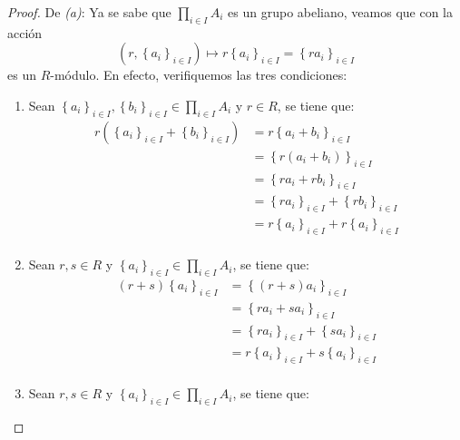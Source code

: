 \documentclass[12pt]{report}
\newcounter{it}
\theoremstyle{largebreak}
\begin{document}
    \begin{proof}
        De \textit{(a)}: Ya se sabe que $\prod_{ i\in I}A_i$ es un grupo abeliano, veamos que con la acción
        \begin{equation*}
            \left(r,\left\{a_i \right\}_{ i\in I} \right)\mapsto r\left\{a_i \right\}_{ i\in I}=\left\{ra_i \right\}_{ i\in I}
        \end{equation*}
        es un $R$-módulo. En efecto, verifiquemos las tres condiciones:
        \begin{enumerate}[label = \textit{(\arabic*)}]
            \item Sean $\left\{a_i \right\}_{ i\in I},\left\{b_i \right\}_{ i\in I}\in\prod_{ i\in I}A_i$ y $r\in R$, se tiene que:
            \begin{equation*}
                \begin{split}
                    r\left(\left\{a_i \right\}_{ i\in I}+\left\{b_i \right\}_{ i\in I} \right)&=r\left\{a_i+b_i \right\}_{ i\in I}\\
                    &=\left\{r(a_i+b_i) \right\}_{ i\in I}\\
                    &=\left\{ra_i+rb_i \right\}_{ i\in I}\\
                    &=\left\{ra_i \right\}_{ i\in I}+\left\{rb_i \right\}_{ i\in I}\\
                    &=r\left\{a_i \right\}_{ i\in I}+r\left\{a_i \right\}_{ i\in I}\\
                \end{split}
            \end{equation*}
            \item Sean $r,s\in R$ y $\left\{a_i \right\}_{ i\in I}\in\prod_{ i\in I}A_i$, se tiene que:
            \begin{equation*}
                \begin{split}
                    (r+s)\left\{a_i \right\}_{ i\in I}&=\left\{(r+s)a_i \right\}_{ i\in I}\\
                    &=\left\{ra_i+sa_i \right\}_{ i\in I}\\
                    &=\left\{ra_i \right\}_{ i\in I}+\left\{sa_i \right\}_{ i\in I}\\
                    &=r\left\{a_i \right\}_{ i\in I}+s\left\{a_i \right\}_{ i\in I}\\
                \end{split}
            \end{equation*}
            \item Sean $r,s\in R$ y $\left\{a_i \right\}_{ i\in I}\in\prod_{ i\in I}A_i$, se tiene que:

\end{enumerate}
\end{proof}
\end{document}
